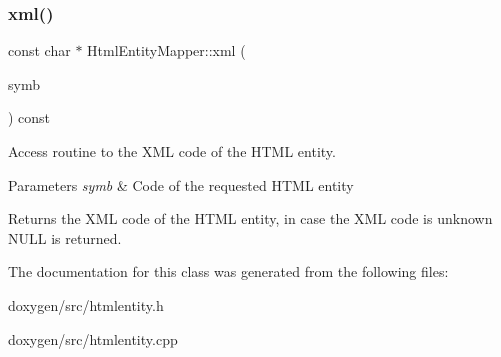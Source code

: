 \subsubsection{\texorpdfstring{xml()}{xml()}}
{\footnotesize\ttfamily const char $\ast$ Html\+Entity\+Mapper\+::xml (\begin{DoxyParamCaption}\item[{Doc\+Symbol\+::\+Sym\+Type}]{symb }\end{DoxyParamCaption}) const}



Access routine to the X\+ML code of the H\+T\+ML entity. 


\begin{DoxyParams}{Parameters}
{\em symb} & Code of the requested H\+T\+ML entity \\
\hline
\end{DoxyParams}
\begin{DoxyReturn}{Returns}
the X\+ML code of the H\+T\+ML entity, in case the X\+ML code is unknown {\ttfamily N\+U\+LL} is returned. 
\end{DoxyReturn}


The documentation for this class was generated from the following files\+:\begin{DoxyCompactItemize}
\item 
doxygen/src/htmlentity.\+h\item 
doxygen/src/htmlentity.\+cpp\end{DoxyCompactItemize}
